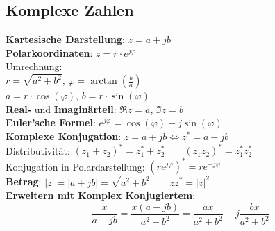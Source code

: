 \documentclass[fs, footer]{latex4ei}
\begin{document}
\begin{multicols*}{4}
{        \subsection{Komplexe Zahlen}
        \textbf{Kartesische Darstellung}: $z = a + j b$\\
        \textbf{Polarkoordinaten}: $z = r \cdot e^{j \varphi}$\\

        Umrechnung:\\
        $r = \sqrt{a^2 + b^2}$, $\varphi = \arctan\left(\frac{b}{a}\right)$\\
        $a = r \cdot \cos(\varphi)$, $b = r \cdot \sin(\varphi)$\\

        \textbf{Real-} und \textbf{Imaginärteil}: $\Re z = a$, $\Im z = b$\\

        \textbf{Euler'sche Formel}: $e^{j \varphi} = \cos(\varphi) + j \sin(\varphi)$\\

        \textbf{Komplexe Konjugation}: $z = a + jb \iff z^* = a - j b$\\
        Distributivität: $(z_1+z_2)^*=z_1^*+z_2^*\qquad (z_1z_2)^*=z_1^*z_2^*$\\
        Konjugation in Polardarstellung: $(r e^{j\varphi})^* = r e^{-j\varphi}$\\

        \textbf{Betrag}: $|z| = |a+jb| = \sqrt{a^2+b^2}\qquad zz^* = |z|^2$\\

        \textbf{Erweitern mit Komplex Konjugiertem}:\\
        $$
        \frac{x}{a+jb} = \frac{x(a-jb)}{a^2+b^2} = \frac{ax}{a^2+b^2} - j\frac{bx}{a^2+b^2}
        $$
    }


\end{multicols*}
\end{document}
